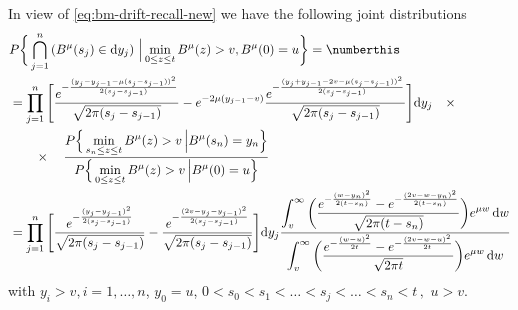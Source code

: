 \begin{theorem}\label{thm:pre-mdr-joint}
	In view of \eqref{eq:bm-drift-recall-new} we have the following joint distributions
	\begin{align*}
	&P \bigg\{ \bigcap_{j=1}^n \left( B^\mu(s_j) \in \mathrm d y_j \right) \,\Big \vert \min_{0\leq z \leq t} B^\mu(z)> v , B^\mu(0)=u \bigg \} = \numberthis \label{eq:bmd-joint-dist-drift-new} \\
	&=
	\prod_{j=1}^{n} \Bigg[
	\frac{
		e^{- \frac{ (y_j - y_{j-1} - \mu( s_j - s_{j-1} ) )^2}{2 (s_j - s_{j-1}) } } 
	}{ %
		\sqrt{2\pi (s_j - s_{j-1}) } } - 
	e^{ - 2 \mu (y_{j-1} - v)} 
	\frac{
		e^{- \frac{ (y_j + y_{j-1} - 2v - \mu( s_j - s_{j-1} ) )^2}{2 (s_j - s_{j-1}) } } 
	}{ %
		\sqrt{2\pi (s_j - s_{j-1}) } }	\Bigg] \mathrm d y_j \quad \times \\
	& \qquad \times \quad 
	\frac{\displaystyle 
		P \Big\{   \min_{s_{n}\leq z \leq t} B^\mu(z)> v  \, \Big \vert B^\mu (s_n) = y_n 
		  \Big \} 
	}{
		\displaystyle
		P \Big \{  \min_{0\leq z \leq t} B^{\mu}(z)> v \,  \Big \vert  B^\mu(0) = u  \Big\}
	}  
	\\
	&=
	\prod_{j=1}^{n} \Bigg[
	\frac{
		e^{- \frac{ (y_j - y_{j-1} )^2}{2 (s_j - s_{j-1}) } } 
	}{ %
		\sqrt{2\pi (s_j - s_{j-1}) } } - 
	\frac{
		e^{- \frac{ (2v - y_j - y_{j-1} )^2}{2 (s_j - s_{j-1}) } } 
	}{ %
		\sqrt{2\pi (s_j - s_{j-1}) } }	\Bigg] \mathrm d y_j 
	\frac{ 
		\displaystyle
		\int_v^\infty 
		\bigg( 
		\frac{ 
			e^{- \frac{ (w - y_{n} )^2}{2 (t - s_{n}) } } - 
			e^{- \frac{ (2v - w - y_{n} )^2}{2 (t - s_{n}) } } 
		} 
		{ 
			 \sqrt{2\pi (t - s_{n}) }
		} 
		\bigg)  e^{\mu w} \,\mathrm d w 
		}{
		\displaystyle
		\int_v^\infty 
		\bigg(
		\frac{ 
		e^{- \frac{ (w - u )^2}{2 t } } - 
		e^{- \frac{ (2v - w - u )^2}{2 t } } 
	}{
		  \sqrt{2\pi t } 
}
		\bigg)  e^{\mu w} \,\mathrm d w  
	}  
	\end{align*}
	with $ y_i > v, i=1, \ldots,n $,  $ y_0=
	u $, $ 0<s_0 < s_1 < \ldots < s_j < \ldots < s_n < t\,,\,\, u>v $.
\end{theorem}
%
%
